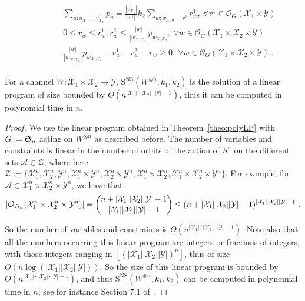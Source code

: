 \begin{theorem}
\begin{equation}
\begin{aligned}
    &&&&& \sum_{u:u_{\mathcal{X}_1}=v^1_{\mathcal{X}_1}} p_u = \frac{|v^1_{\mathcal{X}_1}|}{|v^1|} k_2 \sum_{w:w_{\mathcal{X}_1\mathcal{Y}}=v^1} r^1_w, \: \forall v^1 \in \mathcal{O}_G(\mathcal{X}_1 \times \mathcal{Y})\\
    &&&&& 0 \leq r_w \leq r^1_w,r^2_w \leq \frac{|w|}{|w_{\mathcal{X}_1\mathcal{X}_2}|}p_{w_{\mathcal{X}_1\mathcal{X}_2}}, \: \forall w \in \mathcal{O}_G(\mathcal{X}_1 \times \mathcal{X}_2 \times \mathcal{Y})\\
    &&&&& \frac{|w|}{|w_{\mathcal{X}_1\mathcal{X}_2}|}p_{w_{\mathcal{X}_1\mathcal{X}_2}} -  r^1_w - r^2_w + r_w \geq 0, \: \forall w \in \mathcal{O}_G(\mathcal{X}_1 \times \mathcal{X}_2 \times \mathcal{Y}) \ .\\
  \end{aligned}
  \end{equation}
\end{theorem}


\begin{corollary}
  For a channel $W : \mathcal{X}_1 \times \mathcal{X}_2 \to \mathcal{Y}$, $\mathrm{S}^{\mathrm{NS}}(W^{\otimes n},k_1,k_2)$ is the solution of a linear program of size bounded by $O\left(n^{|\mathcal{X}_1|\cdot|\mathcal{X}_2 |\cdot|\mathcal{Y}|-1}\right)$, thus it can be computed in polynomial time in $n$.
  \label{cor:poly}
\end{corollary}
\begin{proof}
  We use the linear program obtained in Theorem~\ref{theo:polyLP} with $G:=\mathfrak S_n$ acting on $W^{\otimes n}$ as described before. 
  The number of variables and constraints is linear in the number of orbits of the action of $S^n$ on the different sets $\mathcal{A} \in \mathcal{Z}$, where here $\mathcal{Z} := \{\mathcal{X}_1^n, \mathcal{X}_2^n, \mathcal{Y}^n, \mathcal{X}^n_1 \times \mathcal{Y}^n, \mathcal{X}^n_2 \times \mathcal{Y}^n, \mathcal{X}^n_1 \times \mathcal{X}^n_2,  \mathcal{X}^n_1 \times \mathcal{X}^n_2 \times \mathcal{Y}^n \}$. For example, for $\mathcal{A} \in \mathcal{X}^n_1 \times \mathcal{X}^n_2 \times \mathcal{Y}^n$, we have that:
\[ |\mathcal{O}_{\permutations_n}(\mathcal{X}^n_1 \times \mathcal{X}^n_2 \times \mathcal{Y}^n)| = \binom{n + |\mathcal{X}_1||\mathcal{X}_2| |\mathcal{Y}|   - 1}{|\mathcal{X}_1| |\mathcal{X}_2| |\mathcal{Y}| - 1} \leq (n+|\mathcal{X}_1||\mathcal{X}_2| |\mathcal{Y}|-1)^{|\mathcal{X}_1||\mathcal{X}_2| |\mathcal{Y}| - 1} \ .\]

So the number of variables and constraints is $O(n^{|\mathcal{X}_1|\cdot|\mathcal{X}_2 |\cdot|\mathcal{Y}|-1})$. Note also that all the numbers occurring this linear program are integers or fractions of integers, with those integers ranging in $\left[\left(|\mathcal{X}_1||\mathcal{X}_2||\mathcal{Y}|\right)^n\right]$, thus of size $O(n\log(|\mathcal{X}_1||\mathcal{X}_2||\mathcal{Y}|))$. So the size of this linear program is bounded by $O(n^{|\mathcal{X}_1|\cdot|\mathcal{X}_2 |\cdot|\mathcal{Y}|-1})$, and thus $\mathrm{S}^{\mathrm{NS}}(W^{\otimes n},k_1,k_2)$ can be computed in polynomial time in $n$; see for instance Section 7.1 of~\cite{GM07}.
\end{proof}

